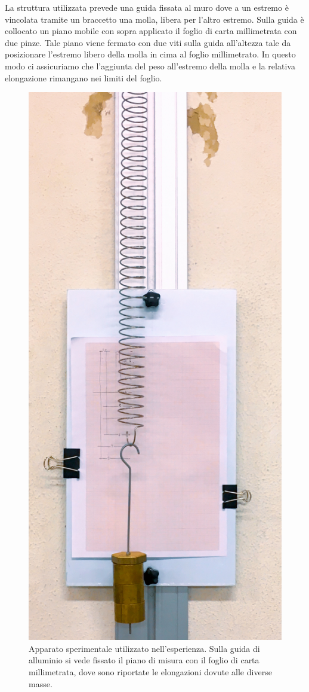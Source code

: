 \documentclass[italian, a4paper, 10pt, twocolumn]{../../style/lab_unige}
\begin{document}
    La struttura utilizzata prevede una guida fissata al muro dove a un estremo è vincolata tramite un braccetto 
    una molla, libera per l'altro estremo. Sulla guida è collocato un piano mobile con sopra applicato il foglio 
    di carta millimetrata con due pinze. Tale piano viene fermato con due viti sulla guida all'altezza tale da
    posizionare l'estremo libero della molla in cima al foglio millimetrato. In questo modo ci assicuriamo che 
    l'aggiunta del peso all'estremo della molla e la relativa elongazione rimangano nei limiti del foglio.

    \begin{figure}[h!]
        \centering
        \includegraphics[width=0.77\linewidth]{IMG_0242.JPG}
        \caption{Apparato sperimentale utilizzato nell'esperienza. Sulla guida di alluminio si vede fissato il
        piano di misura con il foglio di carta millimetrata, dove sono riportate le elongazioni dovute alle 
        diverse masse.}
        \label{figure:apparatus}
    \end{figure}
\end{document}
